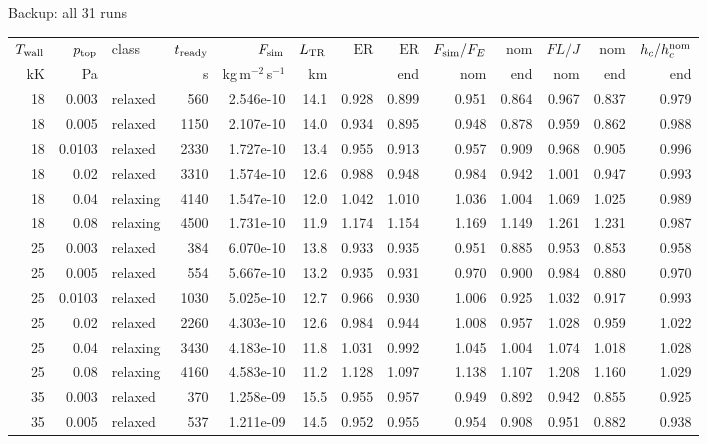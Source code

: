 \documentclass[aspectratio=169,10pt]{beamer}
\newcommand{\Twall}{T_{\rm wall}}
\newcommand{\ptop}{p_{\rm top}}
\newcommand{\LTR}{L_{\rm TR}}
\newcommand{\Fsim}{F_{\rm sim}}
\newcommand{\ER}{\mathrm{ER}}
\begin{document}
\begin{frame}{Backup: all 31 runs}
  \tiny
  \setlength{\tabcolsep}{3.2pt}
  \renewcommand{\arraystretch}{0.82}
  \begin{center}
  \begin{tabular}{@{}rrlrrrrrrrrrr@{}}
    \toprule
    $\Twall$ & $\ptop$ & class & $t_{\rm ready}$ & $\Fsim$ & $\LTR$ & $\ER$ & $\ER$ &
      $\Fsim/F_E$ & nom & $FL/J$ & nom & $h_c/h_c^{\rm nom}$ \\
    kK & Pa & & s & kg\,m$^{-2}$\,s$^{-1}$ & km & & end & nom & end & nom & end & end \\
    \midrule
18 & 0.003 & relaxed & 560 & 2.546e-10 & 14.1 & 0.928 & 0.899 & 0.951 & 0.864 & 0.967 & 0.837 & 0.979 \\
18 & 0.005 & relaxed & 1150 & 2.107e-10 & 14.0 & 0.934 & 0.895 & 0.948 & 0.878 & 0.959 & 0.862 & 0.988 \\
18 & 0.0103 & relaxed & 2330 & 1.727e-10 & 13.4 & 0.955 & 0.913 & 0.957 & 0.909 & 0.968 & 0.905 & 0.996 \\
18 & 0.02 & relaxed & 3310 & 1.574e-10 & 12.6 & 0.988 & 0.948 & 0.984 & 0.942 & 1.001 & 0.947 & 0.993 \\
18 & 0.04 & relaxing & 4140 & 1.547e-10 & 12.0 & 1.042 & 1.010 & 1.036 & 1.004 & 1.069 & 1.025 & 0.989 \\
18 & 0.08 & relaxing & 4500 & 1.731e-10 & 11.9 & 1.174 & 1.154 & 1.169 & 1.149 & 1.261 & 1.231 & 0.987 \\
25 & 0.003 & relaxed & 384 & 6.070e-10 & 13.8 & 0.933 & 0.935 & 0.951 & 0.885 & 0.953 & 0.853 & 0.958 \\
25 & 0.005 & relaxed & 554 & 5.667e-10 & 13.2 & 0.935 & 0.931 & 0.970 & 0.900 & 0.984 & 0.880 & 0.970 \\
25 & 0.0103 & relaxed & 1030 & 5.025e-10 & 12.7 & 0.966 & 0.930 & 1.006 & 0.925 & 1.032 & 0.917 & 0.993 \\
25 & 0.02 & relaxed & 2260 & 4.303e-10 & 12.6 & 0.984 & 0.944 & 1.008 & 0.957 & 1.028 & 0.959 & 1.022 \\
25 & 0.04 & relaxing & 3430 & 4.183e-10 & 11.8 & 1.031 & 0.992 & 1.045 & 1.004 & 1.074 & 1.018 & 1.028 \\
25 & 0.08 & relaxing & 4160 & 4.583e-10 & 11.2 & 1.128 & 1.097 & 1.138 & 1.107 & 1.208 & 1.160 & 1.029 \\
35 & 0.003 & relaxed & 370 & 1.258e-09 & 15.5 & 0.955 & 0.957 & 0.949 & 0.892 & 0.942 & 0.855 & 0.925 \\
35 & 0.005 & relaxed & 537 & 1.211e-09 & 14.5 & 0.952 & 0.955 & 0.954 & 0.908 & 0.951 & 0.882 & 0.938 \\

\end{tabular}
\end{center}
\end{frame}
\end{document}
